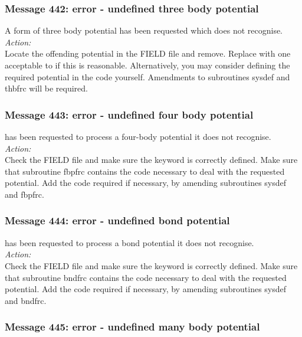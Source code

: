 \subsubsection*{Message 442: error - undefined three body potential}

A form of three body potential has been requested which
\D{} does not recognise.  \\

\noindent
{\em Action:} \\ Locate the offending potential in the FIELD file and
remove. Replace with one acceptable to \D{} if this is
reasonable. Alternatively, you may consider defining the required
potential in the code yourself. Amendments to subroutines {\sc sysdef}
and {\sc thbfrc} will be required.

\subsubsection*{Message 443: error - undefined four body potential}

\D{} has been requested to process a four-body
potential  it does not
recognise. \\

\noindent
{\em Action:}\\
Check the FIELD file and make sure the keyword is correctly defined.
Make sure that subroutine {\sc fbpfrc} contains the code necessary to
deal with the requested potential. Add the code required if
necessary, by amending subroutines {\sc sysdef} and {\sc fbpfrc}.

\subsubsection*{Message 444: error - undefined bond potential}

\D{} has been requested to process a bond potential  it does not
recognise. \\

\noindent
{\em Action:} \\
Check the FIELD file and make sure the keyword is correctly defined.
Make sure that subroutine {\sc bndfrc} contains the code necessary to
deal with the requested potential. Add the code required if
necessary, by amending subroutines {\sc sysdef} and {\sc bndfrc}.

\subsubsection*{Message 445: error - undefined many body potential}

